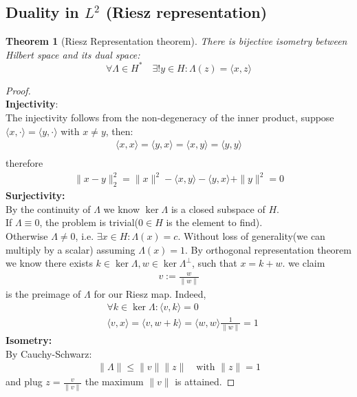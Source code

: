 \documentclass[a4paper,11pt,fleqn]{book}
\newtheorem{theorem}{Theorem}[section]
\theoremstyle{definition}
\theoremstyle{remark}
\begin{document}
\subsection{Duality in \texorpdfstring{$L^2$}{L\textasciicircum{}2} (Riesz representation)}
\begin{theorem}[Riesz Representation theorem]
There is bijective isometry between Hilbert space and its dual space:
\begin{equation*}
	\forall \Lambda \in H^* \quad  \exists! y \in H: \Lambda(z) = \langle x, z\rangle
\end{equation*}
\end{theorem}
\begin{proof}\quad\\
\textbf{Injectivity}:\\ The injectivity follows from the non-degeneracy of the inner product, suppose $\langle x, \cdot \rangle = \langle y, \cdot \rangle$ with $x \neq y$, then:
\begin{align*}
	\langle x, x \rangle = \langle y, x \rangle = \langle x, y \rangle = \langle y, y \rangle\\
\end{align*}
therefore
\begin{align*}
	\|x - y\|_2^2 = \|x\|^2 - \langle x, y\rangle - \langle y, x \rangle + \|y\|^2 = 0
\end{align*}
\textbf{Surjectivity:}\\
By the continuity of $\Lambda$ we know $\ker\Lambda$ is a closed subspace of $H$.\\
If $\Lambda \equiv 0$, the problem is trivial($0 \in H$ is the element to find).\\
Otherwise $\Lambda \neq 0$, i.e. $\exists x \in H: \Lambda(x) = c$. Without loss of generality(we can multiply by a scalar) assuming $\Lambda(x) = 1$. By orthogonal representation theorem we know there exists $k \in \ker \Lambda, w \in \ker\Lambda^\perp$, such that $x = k + w$. we claim 
\begin{align*}
	v := \frac{w}{\|w\|}
\end{align*}
is the preimage of $\Lambda$ for our Riesz map. Indeed, 
\begin{align*}
	&\forall k \in \ker \Lambda : \langle v, k \rangle = 0\\
	&\langle v, x\rangle = \langle v, w + k \rangle =  \langle w, w \rangle \frac{1}{\|w\|} = 1
\end{align*}
\textbf{Isometry:}\\
By Cauchy-Schwarz:
\begin{align*}
	\|\Lambda\| \leq \|v\|\|z\| \quad \text{with } \|z\| = 1
\end{align*}
and plug $z = \frac{v}{\|v\|}$ the maximum $\|v\|$ is attained.
\end{proof}
\end{document}
